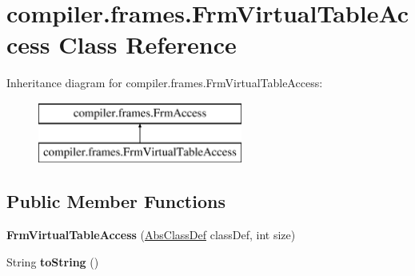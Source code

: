 \hypertarget{classcompiler_1_1frames_1_1_frm_virtual_table_access}{}\section{compiler.\+frames.\+Frm\+Virtual\+Table\+Access Class Reference}
\label{classcompiler_1_1frames_1_1_frm_virtual_table_access}
Inheritance diagram for compiler.\+frames.\+Frm\+Virtual\+Table\+Access\+:\begin{figure}[H]
\begin{center}
\leavevmode
\includegraphics[height=2.000000cm]{classcompiler_1_1frames_1_1_frm_virtual_table_access}
\end{center}
\end{figure}
\subsection*{Public Member Functions}
\begin{DoxyCompactItemize}
\item 
\mbox{\label{classcompiler_1_1frames_1_1_frm_virtual_table_access_a46399771757b3b2c16f2f783a2cea3e0}} 
{\bfseries Frm\+Virtual\+Table\+Access} (\hyperlink{classcompiler_1_1abstr_1_1tree_1_1def_1_1_abs_class_def}{Abs\+Class\+Def} class\+Def, int size)
\item 
\mbox{\label{classcompiler_1_1frames_1_1_frm_virtual_table_access_a77e1ed6ffa341909653ea3797159a8d9}} 
String {\bfseries to\+String} ()
\end{DoxyCompactItemize}
